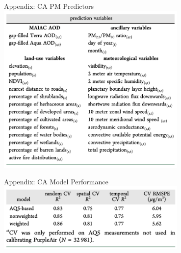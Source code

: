 \begin{frame}{Appendix: CA PM Predictors}
    \centering
    \includegraphics[width=0.7\textwidth]{img/ca_var.png}
\end{frame}
\begin{frame}{Appendix: CA Model Performance}
    \centering
    \includegraphics[width=0.7\textwidth]{img/ca_model.png}
\end{frame}